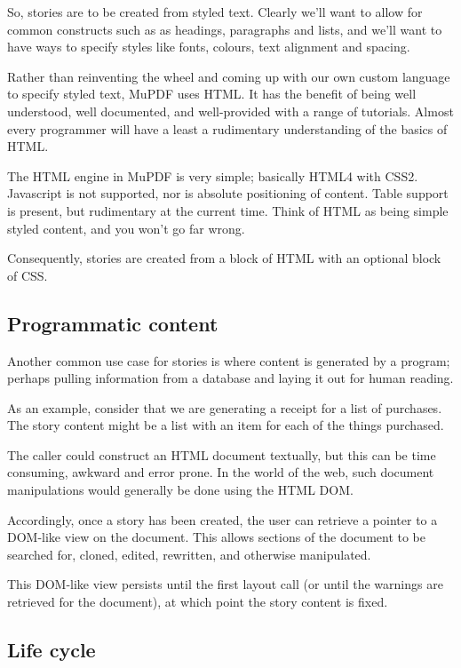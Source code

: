 \documentclass[oneside]{book}
\begin{document}
So, stories are to be created from styled text. Clearly we'll want to allow for common constructs such as as headings, paragraphs and lists, and we'll want to have ways to specify styles like fonts, colours, text alignment and spacing.

Rather than reinventing the wheel and coming up with our own custom language to specify styled text, MuPDF uses HTML. It has the benefit of being well understood, well documented, and well-provided with a range of tutorials. Almost every programmer will have a least a rudimentary understanding of the basics of HTML.

The HTML engine in MuPDF is very simple; basically HTML4 with CSS2. Javascript is not supported, nor is absolute positioning of content. Table support is present, but rudimentary at the current time. Think of HTML as being simple styled content, and you won't go far wrong.

Consequently, stories are created from a block of HTML with an optional block of CSS.

\subsection{Programmatic content}

Another common use case for stories is where content is generated by a program; perhaps pulling information from a database and laying it out for human reading.

As an example, consider that we are generating a receipt for a list of purchases. The story content might be a list with an item for each of the things purchased.

The caller could construct an HTML document textually, but this can be time consuming, awkward and error prone. In the world of the web, such document manipulations would generally be done using the HTML DOM.

Accordingly, once a story has been created, the user can retrieve a pointer to a DOM-like view on the document. This allows sections of the document to be searched for, cloned, edited, rewritten, and otherwise manipulated.

This DOM-like view persists until the first layout call (or until the warnings are retrieved for the document), at which point the story content is fixed.

\subsection{Life cycle}
\end{document}
